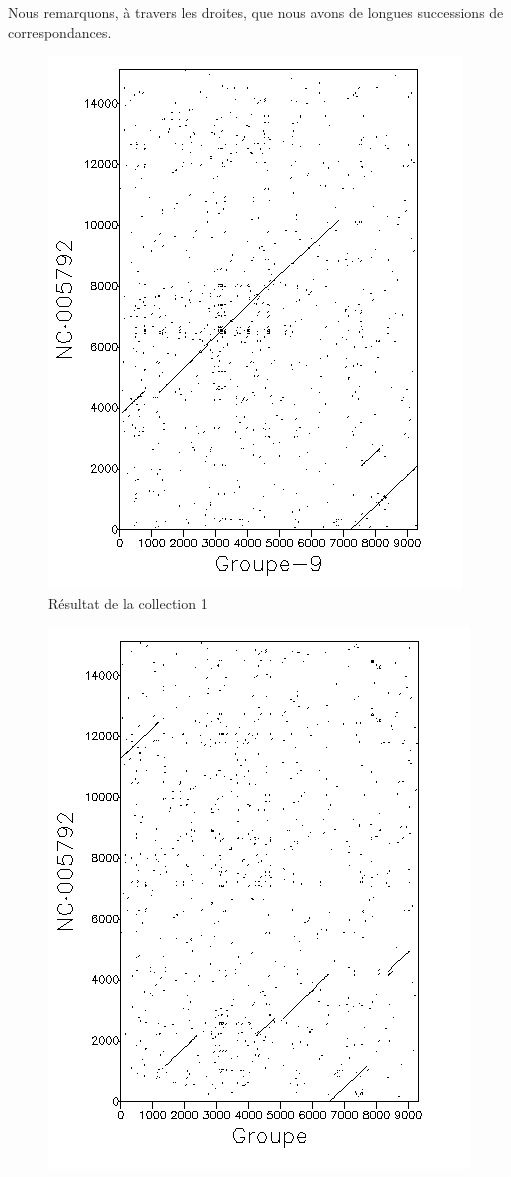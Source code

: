 Nous remarquons, à travers les droites, que nous avons de longues successions de
correspondances.

\begin{figure}[!ht]
	\begin{minipage}[r]{.46\linewidth}
		\begin{center}
		\includegraphics[scale= 0.7]{../res/cible1.png}
		Résultat de la collection 1
	\end{center}
\end{minipage} \hfill
\begin{minipage}[c]{.46 \linewidth}
	\begin{center}
			\includegraphics[scale= 0.7]{../res/cible1-ic.png}

\end{center}
\end{minipage}
\end{figure}
